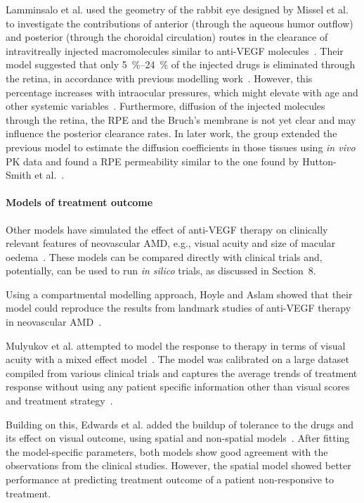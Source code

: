 \documentclass{article}
\begin{document}
Lamminsalo et al. used the geometry of the rabbit eye designed by Missel et al. to investigate the contributions of anterior (through the aqueous humor outflow) and posterior (through the choroidal circulation) routes in the clearance of intravitreally injected macromolecules similar to anti-VEGF molecules~\cite{Lamminsalo_2018}.
Their model suggested that only \SIrange[range-units = single]{5}{24}{\percent} of the injected drugs is eliminated through the retina, in accordance with previous modelling work~\cite{HuttonSmith_2017}.
However, this percentage increases with intraocular pressures, which might elevate with age and other systemic variables~\cite{Armaly_1967,Hashemi_2005}.
Furthermore, diffusion of the injected molecules through the retina, the RPE and the Bruch's membrane is not yet clear and may influence the posterior clearance rates.
In later work, the group extended the previous model to estimate the diffusion coefficients in those tissues using \textit{in vivo} PK data and found a RPE permeability similar to the one found by Hutton-Smith et al.~\cite{Lamminsalo_2020,HuttonSmith_2017}.

\paragraph*{Models of treatment outcome}

Other models have simulated the effect of anti-VEGF therapy on clinically relevant features of neovascular AMD, e.g., visual acuity and size of macular oedema~\cite{Edwards_2020, Hoyle_2017, Mulyukov_2018}.
These models can be compared directly with clinical trials and, potentially, can be used to run \textit{in silico} trials, as discussed in Section~8. %

Using a compartmental modelling approach, Hoyle and Aslam showed that their model could reproduce the results from landmark studies of anti-VEGF therapy in neovascular AMD~\cite{Hoyle_2017}.

Mulyukov et al. attempted to model the response to therapy in terms of visual acuity with a mixed effect model~\cite{Mulyukov_2018}.
The model was calibrated on a large dataset compiled from various clinical trials and captures the average trends of treatment response without using any patient specific information other than visual scores and treatment strategy~\cite{Mulyukov_2018}.

Building on this, Edwards et al. added the buildup of tolerance to the drugs and its effect on visual outcome, using spatial and non-spatial models~\cite{Edwards_2020}.
After fitting the model-specific parameters, both models show good agreement with the observations from the clinical studies.
However, the spatial model showed better performance at predicting treatment outcome of a patient non-responsive to treatment.
\end{document}
